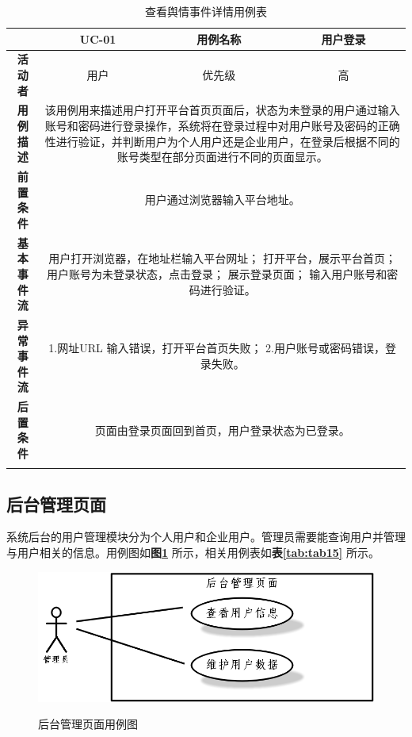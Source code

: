 \begin{longtable}[c]{c|ccc}
	\caption{查看舆情事件详情用例表}
	\label{tab:tab14}\\
	\shline
	\multicolumn{1}{c|}{\textbf{用例编号}} & \multicolumn{1}{c|}{UC-01} & \multicolumn{1}{c|}{用例名称} &  用户登录\\ \hline
	\endhead
	\multicolumn{1}{c|}{\textbf{活动者}} & \multicolumn{1}{c|}{用户} & \multicolumn{1}{c|}{优先级} &高  \\ \hline
	\textbf{用例描述} & \multicolumn{3}{p{12cm}}{该用例用来描述用户打开平台首页页面后，状态为未登录的用户通过输入账号和密码进行登录操作，系统将在登录过程中对用户账号及密码的正确性进行验证，并判断用户为个人用户还是企业用户，在登录后根据不同的账号类型在部分页面进行不同的页面显示。} \\ \hline
	\textbf{前置条件}& \multicolumn{3}{p{12cm}}{用户通过浏览器输入平台地址。} \\ \hline
	\textbf{基本事件流}& \multicolumn{3}{p{12cm}}{用户打开浏览器，在地址栏输入平台网址；\newline
		打开平台，展示平台首页；\newline
		用户账号为未登录状态，点击登录；\newline
		展示登录页面；\newline
		输入用户账号和密码进行验证。} \\ \hline
	\textbf{异常事件流}& \multicolumn{3}{p{12cm}}{1.网址URL 输入错误，打开平台首页失败；\newline
		2.用户账号或密码错误，登录失败。
	} \\ \hline
	\textbf{后置条件}& \multicolumn{3}{p{12cm}}{页面由登录页面回到首页，用户登录状态为已登录。} \\ \shline
\end{longtable}

\subsection{后台管理页面}
系统后台的用户管理模块分为个人用户和企业用户。管理员需要能查询用户并管理与用户相关的信息。用例图如\textbf{图\ref{fig:fig6}} 所示，相关用例表如\textbf{表\ref{tab:tab15}} 所示。

\begin{figure}[!htb]
	\centering\label{fig:fig6}
	\includegraphics[scale=0.5]{image/f6.png}
	\caption{后台管理页面用例图}
\end{figure}

